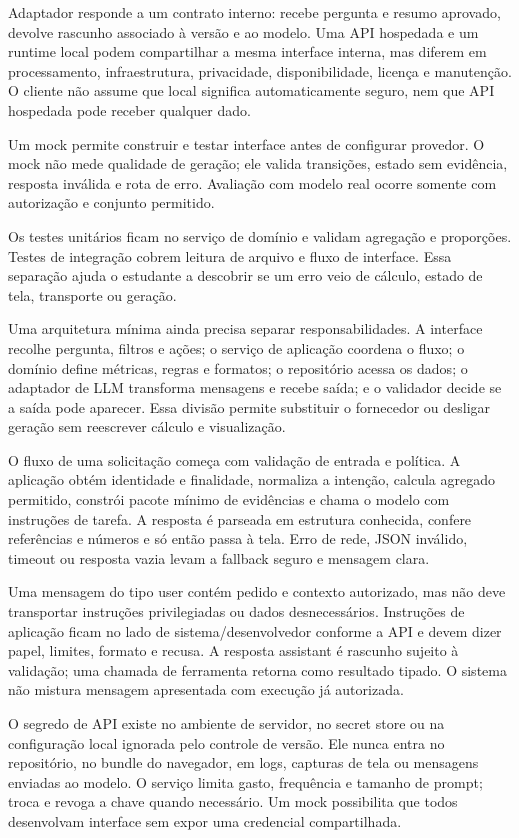 Adaptador responde a um contrato interno: recebe pergunta e resumo aprovado, devolve rascunho associado à versão e ao modelo. Uma API hospedada e um runtime local podem compartilhar a mesma interface interna, mas diferem em processamento, infraestrutura, privacidade, disponibilidade, licença e manutenção. O cliente não assume que local significa automaticamente seguro, nem que API hospedada pode receber qualquer dado.

Um mock permite construir e testar interface antes de configurar provedor. O mock não mede qualidade de geração; ele valida transições, estado sem evidência, resposta inválida e rota de erro. Avaliação com modelo real ocorre somente com autorização e conjunto permitido.

Os testes unitários ficam no serviço de domínio e validam agregação e proporções. Testes de integração cobrem leitura de arquivo e fluxo de interface. Essa separação ajuda o estudante a descobrir se um erro veio de cálculo, estado de tela, transporte ou geração.

Uma arquitetura mínima ainda precisa separar responsabilidades. A interface recolhe pergunta, filtros e ações; o serviço de aplicação coordena o fluxo; o domínio define métricas, regras e formatos; o repositório acessa os dados; o adaptador de LLM transforma mensagens e recebe saída; e o validador decide se a saída pode aparecer. Essa divisão permite substituir o fornecedor ou desligar geração sem reescrever cálculo e visualização.

O fluxo de uma solicitação começa com validação de entrada e política. A aplicação obtém identidade e finalidade, normaliza a intenção, calcula agregado permitido, constrói pacote mínimo de evidências e chama o modelo com instruções de tarefa. A resposta é parseada em estrutura conhecida, confere referências e números e só então passa à tela. Erro de rede, JSON inválido, timeout ou resposta vazia levam a fallback seguro e mensagem clara.

Uma mensagem do tipo user contém pedido e contexto autorizado, mas não deve transportar instruções privilegiadas ou dados desnecessários. Instruções de aplicação ficam no lado de sistema/desenvolvedor conforme a API e devem dizer papel, limites, formato e recusa. A resposta assistant é rascunho sujeito à validação; uma chamada de ferramenta retorna como resultado tipado. O sistema não mistura mensagem apresentada com execução já autorizada.

O segredo de API existe no ambiente de servidor, no secret store ou na configuração local ignorada pelo controle de versão. Ele nunca entra no repositório, no bundle do navegador, em logs, capturas de tela ou mensagens enviadas ao modelo. O serviço limita gasto, frequência e tamanho de prompt; troca e revoga a chave quando necessário. Um mock possibilita que todos desenvolvam interface sem expor uma credencial compartilhada.

